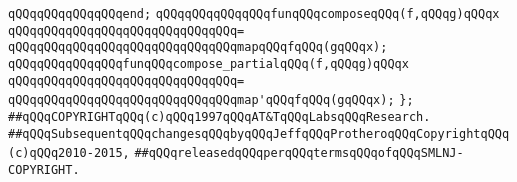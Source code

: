 \verb|qQQqqQQqqQQqqQQqend;|\newline
\newline
\verb|qQQqqQQqqQQqqQQqfunqQQqcomposeqQQq(f,qQQqg)qQQqx|\newline
\verb|qQQqqQQqqQQqqQQqqQQqqQQqqQQqqQQq=|\newline
\verb|qQQqqQQqqQQqqQQqqQQqqQQqqQQqqQQqmapqQQqfqQQq(gqQQqx);|\newline
\newline
\verb|qQQqqQQqqQQqqQQqfunqQQqcompose_partialqQQq(f,qQQqg)qQQqx|\newline
\verb|qQQqqQQqqQQqqQQqqQQqqQQqqQQqqQQq=|\newline
\verb|qQQqqQQqqQQqqQQqqQQqqQQqqQQqqQQqmap'qQQqfqQQq(gqQQqx);|\newline
\newline
\verb|};|\newline
\newline
\newline
\newline
\verb|##qQQqCOPYRIGHTqQQq(c)qQQq1997qQQqAT&TqQQqLabsqQQqResearch.|\newline
\verb|##qQQqSubsequentqQQqchangesqQQqbyqQQqJeffqQQqProtheroqQQqCopyrightqQQq(c)qQQq2010-2015,|\newline
\verb|##qQQqreleasedqQQqperqQQqtermsqQQqofqQQqSMLNJ-COPYRIGHT.|\newline

